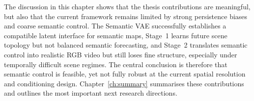 The discussion in this chapter shows that the thesis contributions are meaningful, but also that the current framework remains limited by strong persistence biases and coarse semantic control. The Semantic VAE successfully establishes a compatible latent interface for semantic maps, Stage~1 learns future scene topology but not balanced semantic forecasting, and Stage~2 translates semantic control into realistic RGB video but still loses fine structure, especially under temporally difficult scene regimes. The central conclusion is therefore that semantic control is feasible, yet not fully robust at the current spatial resolution and conditioning design. Chapter~\ref{ch:summary} summarises these contributions and outlines the most important next research directions.
